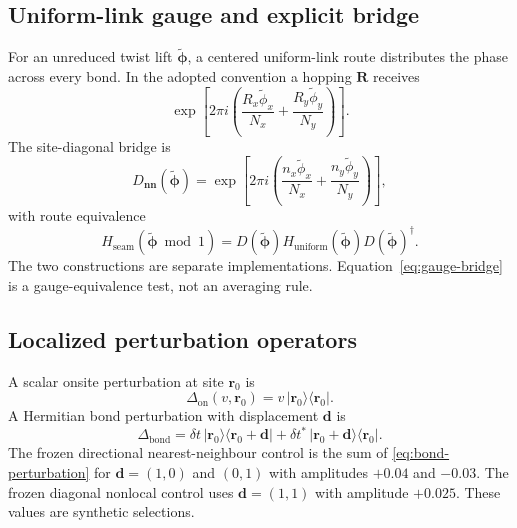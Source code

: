 \documentclass[11pt]{article}
\begin{document}
\subsection{Uniform-link gauge and explicit bridge}

For an unreduced twist lift $\widetilde{\boldsymbol\phi}$, a centered uniform-link route
distributes the phase across every bond.  In the adopted convention a hopping
$\mathbf R$ receives
\begin{equation}
  \exp\!\left[
    2\pi i\left(
      \frac{R_x\widetilde\phi_x}{N_x}
      +\frac{R_y\widetilde\phi_y}{N_y}
    \right)
  \right].
  \label{eq:uniform-link-phase}
\end{equation}
The site-diagonal bridge is
\begin{equation}
  D_{\mathbf n\mathbf n}(\widetilde{\boldsymbol\phi})
  =\exp\!\left[
    2\pi i\left(
      \frac{n_x\widetilde\phi_x}{N_x}
      +\frac{n_y\widetilde\phi_y}{N_y}
    \right)
  \right],
\end{equation}
with route equivalence
\begin{equation}
  H_{\mathrm{seam}}(\widetilde{\boldsymbol\phi}\bmod1)
  =D(\widetilde{\boldsymbol\phi})
   H_{\mathrm{uniform}}(\widetilde{\boldsymbol\phi})
   D(\widetilde{\boldsymbol\phi})^{\dagger}.
  \label{eq:gauge-bridge}
\end{equation}
The two constructions are separate implementations.  Equation~\eqref{eq:gauge-bridge}
is a gauge-equivalence test, not an averaging rule.

\subsection{Localized perturbation operators}

A scalar onsite perturbation at site $\mathbf r_0$ is
\begin{equation}
  \Delta_{\mathrm{on}}(v,\mathbf r_0)
  =v\,|\mathbf r_0\rangle\langle\mathbf r_0|.
\end{equation}
A Hermitian bond perturbation with displacement $\mathbf d$ is
\begin{equation}
  \Delta_{\mathrm{bond}}
  =\delta t\,|\mathbf r_0\rangle
    \langle\mathbf r_0+\mathbf d|
   +\delta t^{*}\,|\mathbf r_0+\mathbf d\rangle
    \langle\mathbf r_0|.
  \label{eq:bond-perturbation}
\end{equation}
The frozen directional nearest-neighbour control is the sum of
\eqref{eq:bond-perturbation} for $\mathbf d=(1,0)$ and $(0,1)$ with amplitudes
$+0.04$ and $-0.03$.  The frozen diagonal nonlocal control uses
$\mathbf d=(1,1)$ with amplitude $+0.025$.  These values are synthetic selections.
\end{document}
